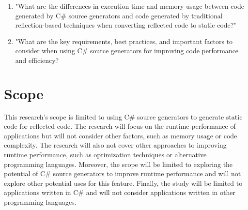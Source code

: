 \begin{enumerate}[label=\textbf{RQ.\arabic*}:, leftmargin=*, labelindent=1em]
    \item "What are the differences in execution time and memory usage between code generated by C\# source generators and code generated by traditional reflection-based techniques when converting reflected code to static code?"
    \item "What are the key requirements, best practices, and important factors to consider when using C\# source generators for improving code performance and efficiency?
\end{enumerate}

\section{Scope}

This research's scope is limited to using C\# source generators to generate static code for reflected code. The research will focus on the runtime performance of applications but will not consider other factors, such as memory usage or code complexity. The research will also not cover other approaches to improving runtime performance, such as optimization techniques or alternative programming languages. Moreover, the scope will be limited to exploring the potential of C\# source generators to improve runtime performance and will not explore other potential uses for this feature. Finally, the study will be limited to applications written in C\# and will not consider applications written in other programming languages.
